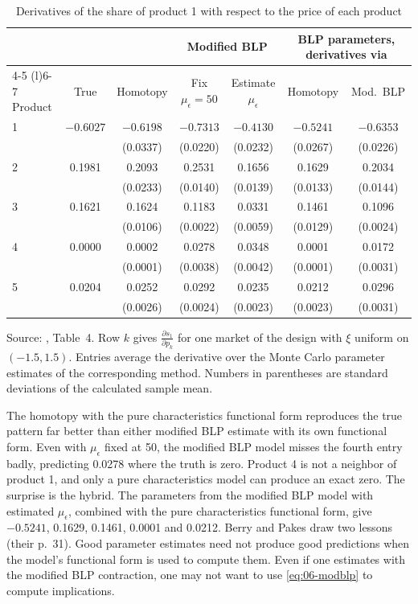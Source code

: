 \begin{table}[htbp]
\centering
\caption{Derivatives of the share of product 1 with respect to the price of each product}
\label{tab:06-bp-subst}
\small
\begin{tabular}{@{}lcccccc@{}}
\toprule
 & & & \multicolumn{2}{c}{Modified BLP} & \multicolumn{2}{c}{BLP parameters, derivatives via} \\
\cmidrule(lr){4-5} \cmidrule(l){6-7}
Product & True & Homotopy & Fix $\mu_\epsilon = 50$ & Estimate $\mu_\epsilon$ & Homotopy & Mod.\ BLP \\
\midrule
1 & $-0.6027$ & $-0.6198$ & $-0.7313$ & $-0.4130$ & $-0.5241$ & $-0.6353$ \\
  &           & (0.0337)  & (0.0220)  & (0.0232)  & (0.0267)  & (0.0226) \\
2 & 0.1981 & 0.2093 & 0.2531 & 0.1656 & 0.1629 & 0.2034 \\
  &        & (0.0233) & (0.0140) & (0.0139) & (0.0133) & (0.0144) \\
3 & 0.1621 & 0.1624 & 0.1183 & 0.0331 & 0.1461 & 0.1096 \\
  &        & (0.0106) & (0.0022) & (0.0059) & (0.0129) & (0.0024) \\
4 & 0.0000 & 0.0002 & 0.0278 & 0.0348 & 0.0001 & 0.0172 \\
  &        & (0.0001) & (0.0038) & (0.0042) & (0.0001) & (0.0031) \\
5 & 0.0204 & 0.0252 & 0.0292 & 0.0235 & 0.0212 & 0.0296 \\
  &        & (0.0026) & (0.0024) & (0.0023) & (0.0023) & (0.0031) \\
\bottomrule
\end{tabular}

\smallskip
\begin{minipage}{0.95\textwidth}
\footnotesize Source: \citet{BerryPakes2007}, Table~4. Row $k$ gives $\frac{\partial s_1}{\partial p_k}$ for one market of the
design with $\xi$ uniform on $(-1.5, 1.5)$. Entries average the derivative over the Monte Carlo parameter estimates of the
corresponding method. Numbers in parentheses are standard deviations of the calculated sample mean.
\end{minipage}
\end{table}

The homotopy with the pure characteristics functional form reproduces the true pattern far better than either modified
BLP estimate with its own functional form. Even with $\mu_\epsilon$ fixed at 50, the modified BLP model misses the fourth
entry badly, predicting 0.0278 where the truth is zero. Product 4 is not a neighbor of product 1, and only a pure
characteristics model can produce an exact zero. The surprise is the hybrid. The parameters from the modified BLP model
with estimated $\mu_\epsilon$, combined with the pure characteristics functional form, give $-0.5241$, 0.1629, 0.1461, 0.0001
and 0.0212. Berry and Pakes draw two lessons (their p.~31). Good parameter estimates need not produce good predictions
when the model's functional form is used to compute them. Even if one estimates with the modified BLP contraction, one may
not want to use \eqref{eq:06-modblp} to compute implications.

